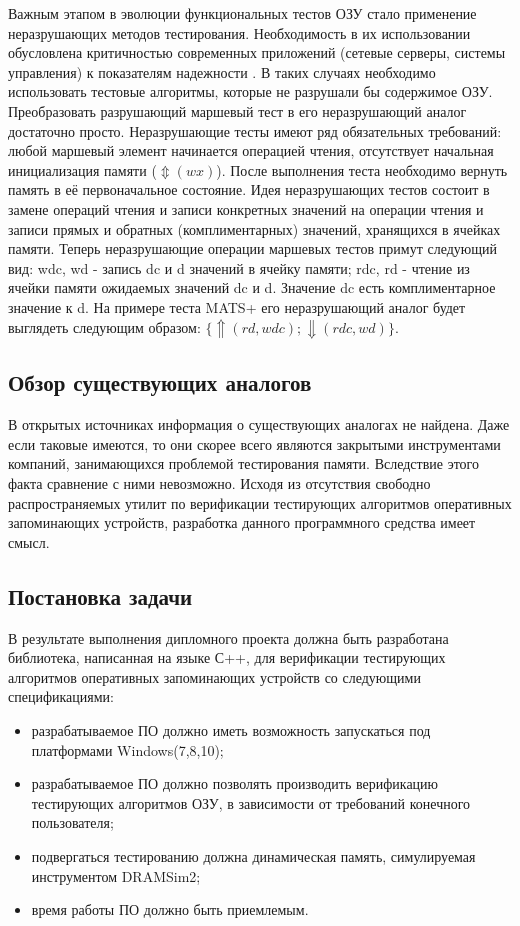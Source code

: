 Важным этапом в эволюции функциональных тестов ОЗУ стало применение неразрушающих методов тестирования. Необходимость в их использовании обусловлена критичностью современных приложений (сетевые серверы, системы управления) к показателям надежности \cite{March_Tests_Ivaniuk}. В таких случаях необходимо использовать тестовые алгоритмы, которые не разрушали бы содержимое ОЗУ. Преобразовать разрушающий маршевый тест в его неразрушающий аналог достаточно просто. Неразрушающие тесты имеют ряд обязательных требований: любой маршевый элемент начинается операцией чтения, отсутствует начальная инициализация памяти ($\Updownarrow (wx)$). После выполнения теста необходимо вернуть память в её первоначальное состояние. Идея неразрушающих тестов состоит в замене операций чтения и записи конкретных значений на операции чтения и записи прямых и обратных (комплиментарных) значений, хранящихся в ячейках памяти. 
Теперь неразрушающие операции маршевых тестов примут следующий вид: wdc, wd - запись dc и d значений в ячейку памяти; rdc, rd - чтение из ячейки памяти ожидаемых значений dc и d. Значение dc есть комплиментарное значение к d. На примере теста MATS+ его неразрушающий аналог будет выглядеть следующим образом: $\{\Uparrow (rd,wdc); \Downarrow (rdc,wd)\}$.

\subsection{Обзор существующих аналогов}
\label{sub:domain:analogue}
В открытых источниках информация о существующих аналогах не найдена. Даже если таковые имеются, то они скорее всего являются закрытыми инструментами компаний, занимающихся проблемой тестирования памяти. Вследствие этого факта сравнение с ними невозможно. Исходя из отсутствия свободно распространяемых утилит по верификации тестирующих алгоритмов оперативных запоминающих устройств, разработка данного программного средства имеет смысл.

\subsection{Постановка задачи}
\label{sub:domain:task}
В результате выполнения дипломного проекта должна быть разработана библиотека, написанная на языке С++, для верификации тестирующих алгоритмов оперативных запоминающих устройств со следующими спецификациями:
\begin{itemize}
  \item разрабатываемое ПО должно иметь возможность запускаться под платформами Windows(7,8,10);
  \item разрабатываемое ПО должно позволять производить верификацию тестирующих алгоритмов ОЗУ, в зависимости от требований
конечного пользователя;
  \item подвергаться тестированию должна динамическая память, симулируемая инструментом DRAMSim2;
  \item время работы ПО должно быть приемлемым.
\end{itemize}




